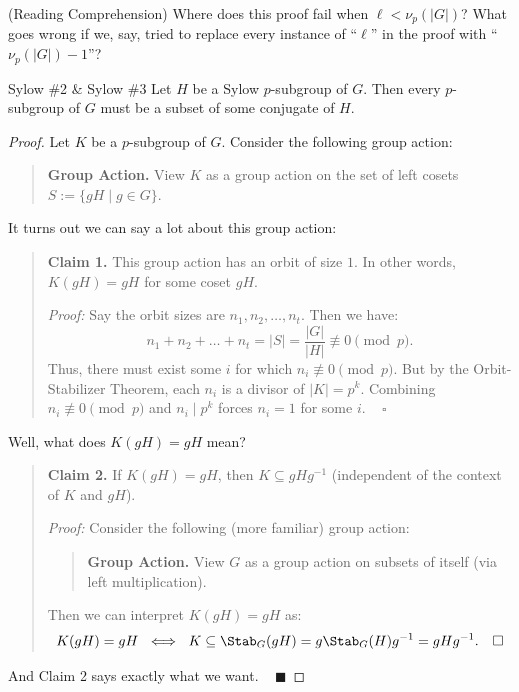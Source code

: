 \begin{remark}
    (Reading Comprehension) Where does this proof fail when $\ell < \nu_p(|G|)$?  What goes wrong if we, say, tried to replace every instance of ``$\ell$'' in the proof with ``$\nu_p(|G|) - 1$''?
\end{remark}

\begin{theorem}{Sylow \#2 \& Sylow \#3}
    Let $H$ be a Sylow $p$-subgroup of $G$.  Then every $p$-subgroup of $G$ must be a subset of some conjugate of $H$.
\end{theorem}

\begin{proof}
    Let $K$ be a $p$-subgroup of $G$.  Consider the following group action:
    \begin{quote}
        \textbf{Group Action.} View $K$ as a group action on the set of left cosets $S := \{gH \mid g \in G\}$.
    \end{quote}
    It turns out we can say a lot about this group action:
    \begin{quote}
        \textbf{Claim 1.} This group action has an orbit of size $1$.  In other words, $K(gH) = gH$ for some coset $gH$.

        \emph{Proof:} Say the orbit sizes are $n_1, n_2, \dots, n_t$.  Then we have:
        \[ n_1 + n_2 + \dots + n_t = |S| = \dfrac{|G|}{|H|} \not \equiv 0 \pmod{p}. \]
        Thus, there must exist some $i$ for which $n_i \not \equiv 0 \pmod{p}$.  But by the Orbit-Stabilizer Theorem, each $n_i$ is a divisor of $|K| = p^k$.  Combining $n_i \not \equiv 0 \pmod{p}$ and $n_i \mid p^k$ forces $n_i = 1$ for some $i$. ~ $\square$
    \end{quote}
    Well, what does $K(gH) = gH$ mean?
    \begin{quote}
        \textbf{Claim 2.} If $K(gH) = gH$, then $K \subseteq gHg^{-1}$ (independent of the context of $K$ and $gH$).

        \emph{Proof:} Consider the following (more familiar) group action:
        \begin{quote}
            \textbf{Group Action.} View $G$ as a group action on subsets of itself (via left multiplication).
        \end{quote}
        Then we can interpret $K(gH) = gH$ as:
        \[ K(gH) = gH ~ \iff ~ K \subseteq \Stab_G(gH) = g\Stab_G(H)g^{-1} = gHg^{-1}. ~~~ \square \]
    \end{quote}
    And Claim 2 says exactly what we want. ~ $\blacksquare$
\end{proof}

